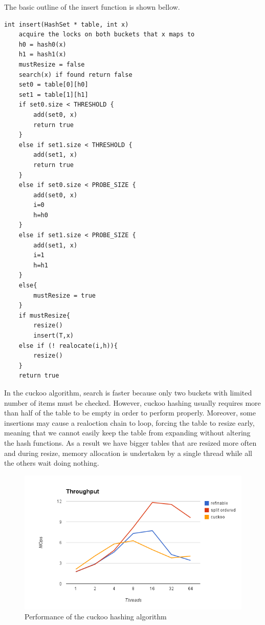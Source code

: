 The basic outline of the insert function is shown bellow.
\begin{lstlisting}[caption={Insert methods of the cuckoo algorithm}]
int insert(HashSet * table, int x)
	acquire the locks on both buckets that x maps to
	h0 = hash0(x)
	h1 = hash1(x)
	mustResize = false
	search(x) if found return false
	set0 = table[0][h0]
	set1 = table[1][h1]
	if set0.size < THRESHOLD {
		add(set0, x)
		return true
	}
	else if set1.size < THRESHOLD {
		add(set1, x)
		return true
	}
	else if set0.size < PROBE_SIZE {
		add(set0, x)
		i=0 
		h=h0
	}
	else if set1.size < PROBE_SIZE {
		add(set1, x)
		i=1
		h=h1
	}
	else{
		mustResize = true
	}
	if mustResize{
		resize()	
		insert(T,x)
	else if (! realocate(i,h)){
		resize()
	}
	return true
\end{lstlisting}


In the cuckoo algorithm, search is faster because only two buckets with limited number of items must be checked. However, cuckoo hashing usually requires more than half of the table to be empty in order to perform properly. Moreover, some insertions may cause a realoction chain to loop, forcing the table to resize early, meaning that we cannot easily keep the table from expanding without altering the hash functions. As a result we have bigger tables that are resized more often and during resize, memory allocation is undertaken by a single thread while all the others wait doing nothing.

\begin{figure}
 \centering
  \includegraphics[scale=0.5]{hashes_cuckoo_perf.png}
\caption{Performance of the cuckoo hashing algorithm}
\label{hashes_cuckoo_perf}
\end{figure}

